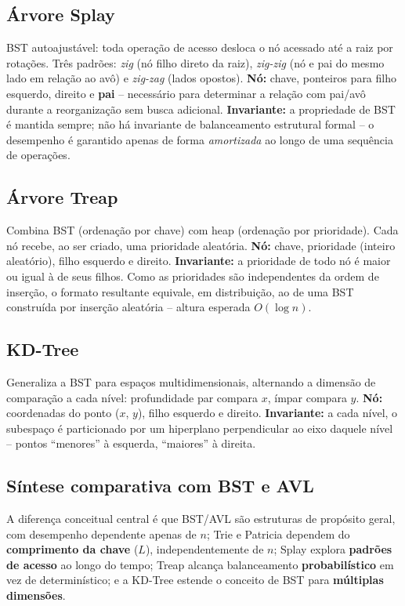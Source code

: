 \documentclass[11pt]{article}
\begin{document}
\subsection{Árvore Splay}

BST autoajustável: toda operação de acesso desloca o nó acessado até a raiz
por rotações. Três padrões: \textit{zig} (nó filho direto da raiz),
\textit{zig-zig} (nó e pai do mesmo lado em relação ao avô) e \textit{zig-zag}
(lados opostos).
\textbf{Nó:} chave, ponteiros para filho esquerdo, direito e \textbf{pai} --
necessário para determinar a relação com pai/avô durante a reorganização sem
busca adicional.
\textbf{Invariante:} a propriedade de BST é mantida sempre; não há invariante
de balanceamento estrutural formal -- o desempenho é garantido apenas de forma
\textit{amortizada} ao longo de uma sequência de operações.

\subsection{Árvore Treap}

Combina BST (ordenação por chave) com heap (ordenação por prioridade). Cada
nó recebe, ao ser criado, uma prioridade aleatória.
\textbf{Nó:} chave, prioridade (inteiro aleatório), filho esquerdo e direito.
\textbf{Invariante:} a prioridade de todo nó é maior ou igual à de seus
filhos. Como as prioridades são independentes da ordem de inserção, o formato
resultante equivale, em distribuição, ao de uma BST construída por inserção
aleatória -- altura esperada $O(\log n)$.

\subsection{KD-Tree}

Generaliza a BST para espaços multidimensionais, alternando a dimensão de
comparação a cada nível: profundidade par compara $x$, ímpar compara $y$.
\textbf{Nó:} coordenadas do ponto ($x$, $y$), filho esquerdo e direito.
\textbf{Invariante:} a cada nível, o subespaço é particionado por um
hiperplano perpendicular ao eixo daquele nível -- pontos ``menores'' à
esquerda, ``maiores'' à direita.

\subsection{Síntese comparativa com BST e AVL}

A diferença conceitual central é que BST/AVL são estruturas de propósito
geral, com desempenho dependente apenas de $n$; Trie e Patricia dependem do
\textbf{comprimento da chave} ($L$), independentemente de $n$; Splay explora
\textbf{padrões de acesso} ao longo do tempo; Treap alcança balanceamento
\textbf{probabilístico} em vez de determinístico; e a KD-Tree estende o
conceito de BST para \textbf{múltiplas dimensões}.
\end{document}
